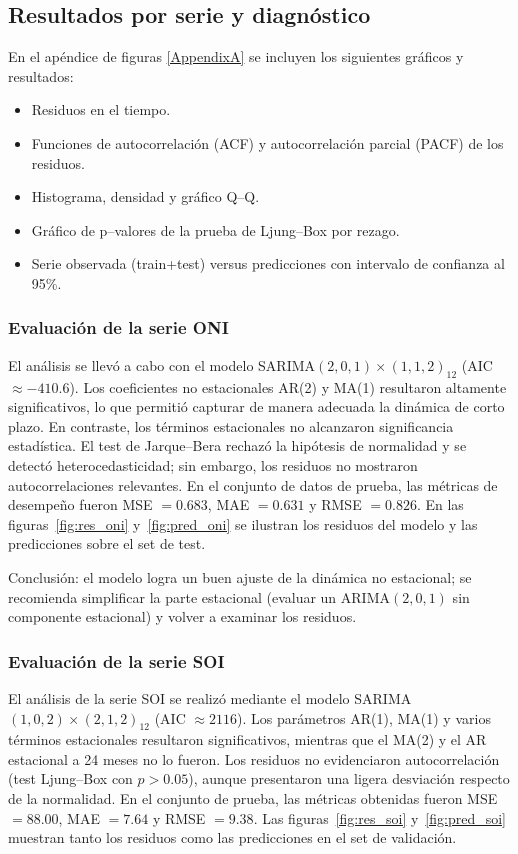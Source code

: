 \subsection{Resultados por serie y diagnóstico}
En el apéndice de figuras \ref{AppendixA} se incluyen los siguientes gráficos y resultados:

\begin{itemize}
    \item Residuos en el tiempo.  
    \item Funciones de autocorrelación (ACF) y autocorrelación parcial (PACF) de los residuos.  
    \item Histograma, densidad y gráfico Q--Q.  
    \item Gráfico de p--valores de la prueba de Ljung--Box por rezago.  
    \item Serie observada (train+test) versus predicciones con intervalo de confianza al 95\%.  
\end{itemize}

\subsubsection{Evaluación de la serie ONI} 
El análisis se llevó a cabo con el modelo SARIMA$(2,0,1)\times(1,1,2)_{12}$ (AIC $\approx -410.6$). 
Los coeficientes no estacionales AR(2) y MA(1) resultaron altamente significativos, lo que permitió capturar de manera adecuada la dinámica de corto plazo. En contraste, los términos estacionales no alcanzaron significancia estadística. El test de Jarque--Bera rechazó la hipótesis de normalidad y se detectó heterocedasticidad; sin embargo, los residuos no mostraron autocorrelaciones relevantes.  
En el conjunto de datos de prueba, las métricas de desempeño fueron MSE $=0.683$, MAE $=0.631$ y RMSE $=0.826$. En las figuras~\ref{fig:res_oni} y~\ref{fig:pred_oni} se ilustran los residuos del modelo y las predicciones sobre el set de test.  

Conclusión: el modelo logra un buen ajuste de la dinámica no estacional; se recomienda simplificar la parte estacional (evaluar un ARIMA$(2,0,1)$ sin componente estacional) y volver a examinar los residuos.  
\vspace{0.3em}


\subsubsection{Evaluación de la serie SOI}
El análisis de la serie SOI se realizó mediante el modelo SARIMA$(1,0,2)\times(2,1,2)_{12}$ (AIC $\approx 2116$). 
Los parámetros AR(1), MA(1) y varios términos estacionales resultaron significativos, mientras que el MA(2) y el AR estacional a 24 meses no lo fueron. Los residuos no evidenciaron autocorrelación (test Ljung--Box con $p>0.05$), aunque presentaron una ligera desviación respecto de la normalidad.  
En el conjunto de prueba, las métricas obtenidas fueron MSE $=88.00$, MAE $=7.64$ y RMSE $=9.38$. Las figuras~\ref{fig:res_soi} y~\ref{fig:pred_soi} muestran tanto los residuos como las predicciones en el set de validación.  

